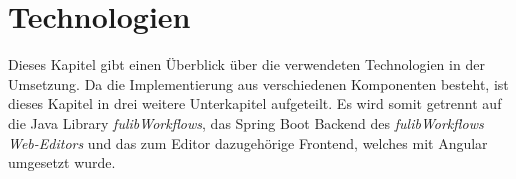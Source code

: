 \section{Technologien}\label{sec:technologien}
Dieses Kapitel gibt einen Überblick über die verwendeten Technologien in der Umsetzung.
Da die Implementierung aus verschiedenen Komponenten besteht, ist dieses Kapitel in drei weitere Unterkapitel aufgeteilt.
Es wird somit getrennt auf die Java Library \textit{fulibWorkflows}, das Spring Boot Backend des \textit{fulibWorkflows Web-Editors}
und das zum Editor dazugehörige Frontend, welches mit Angular umgesetzt wurde.








